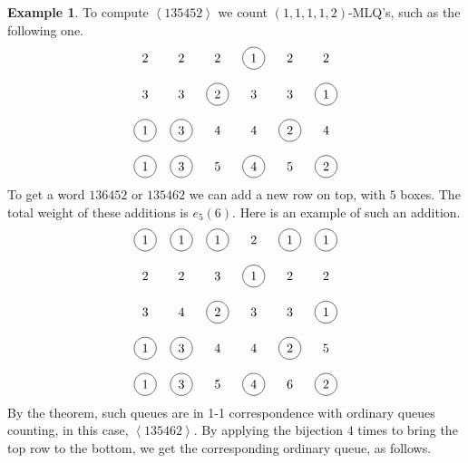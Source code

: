 \documentclass[submission]{FPSAC2018}
\newcommand{\0}{\phantom{c}}
\newcommand{\swt}[1]{\left\langle #1 \right\rangle} %
\theoremstyle{plain}
\theoremstyle{definition}
\newtheorem{example}[thm]{Example}
\numberwithin{equation}{section}
\begin{document}
\begin{example}
To compute $\swt{135452}$ we count $(1,1,1,1,2)$-MLQ's, such as the following one.
\[
\begin{tikzpicture}\node at (0, 4){2};\node at (1, 4){2};\node at (2, 4){2};\node[circle, draw=black] at (3, 4){1};\node at (4, 4){2};\node at (5, 4){2};\node at (0, 3){3};\node at (1, 3){3};\node[circle, draw=black] at (2, 3){2};\node at (3, 3){3};\node at (4, 3){3};\node[circle, draw=black] at (5, 3){1};\node[circle, draw=black] at (0, 2){1};\node[circle, draw=black] at (1, 2){3};\node at (2, 2){4};\node at (3, 2){4};\node[circle, draw=black] at (4, 2){2};\node at (5, 2){4};\node[circle, draw=black] at (0, 1){1};\node[circle, draw=black] at (1, 1){3};\node at (2, 1){5};\node[circle, draw=black] at (3, 1){4};\node at (4, 1){5};\node[circle, draw=black] at (5, 1){2};\end{tikzpicture}
\]
To get a word $136452$ or $135462$ we can add a new row on top, with $5$ boxes. The total weight of these additions is $e_5(6)$. Here is an example of such an addition.
\[
\begin{tikzpicture}\node[circle, draw=black] at (0, 5){1};\node[circle, draw=black] at (1, 5){1};\node[circle, draw=black] at (2, 5){1};\node at (3, 5){2};\node[circle, draw=black] at (4, 5){1};\node[circle, draw=black] at (5, 5){1};\node at (0, 4){2};\node at (1, 4){2};\node at (2, 4){3};\node[circle, draw=black] at (3, 4){1};\node at (4, 4){2};\node at (5, 4){2};\node at (0, 3){3};\node at (1, 3){4};\node[circle, draw=black] at (2, 3){2};\node at (3, 3){3};\node at (4, 3){3};\node[circle, draw=black] at (5, 3){1};\node[circle, draw=black] at (0, 2){1};\node[circle, draw=black] at (1, 2){3};\node at (2, 2){4};\node at (3, 2){4};\node[circle, draw=black] at (4, 2){2};\node at (5, 2){5};\node[circle, draw=black] at (0, 1){1};\node[circle, draw=black] at (1, 1){3};\node at (2, 1){5};\node[circle, draw=black] at (3, 1){4};\node at (4, 1){6};\node[circle, draw=black] at (5, 1){2};\end{tikzpicture}
\]
By the theorem, such queues are in 1-1 correspondence with ordinary queues counting, in this case, $\swt{135462}$. By applying the bijection $4$ times to bring the top row to the bottom, we get the corresponding ordinary queue, as follows.\\


\end{example}
\end{document}
